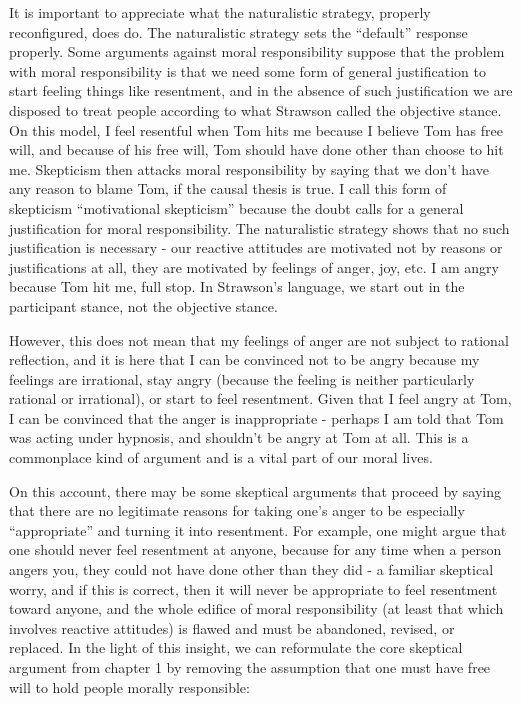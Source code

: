 \documentclass[phd,12pt,oneside,paper=letterpaper]{ubcthesis}
\begin{document}
It is important to appreciate what the naturalistic strategy, properly reconfigured, does do. The naturalistic strategy sets the ``default'' response properly. Some arguments against moral responsibility suppose that the problem with moral responsibility is that we need some form of general justification to start feeling things like resentment, and in the absence of such justification we are disposed to treat people according to what Strawson called the objective stance. On this model, I feel resentful when Tom hits me because I believe Tom has free will, and because of his free will, Tom should have done other than choose to hit me. Skepticism then attacks moral responsibility by saying that we don't have any reason to blame Tom, if the causal thesis is true. I call this form of skepticism ``motivational skepticism'' because the doubt calls for a general justification for moral responsibility. The naturalistic strategy shows that no such justification is necessary - our reactive attitudes are motivated not by reasons or justifications at all, they are motivated by feelings of anger, joy, etc. I am angry because Tom hit me, full stop. In Strawson's language, we start out in the participant stance, not the objective stance. 

However, this does not mean that my feelings of anger are not subject to rational reflection, and it is here that I can be convinced not to be angry because my feelings are irrational, stay angry (because the feeling is neither particularly rational or irrational), or start to feel resentment. Given that I feel angry at Tom, I can be convinced that the anger is inappropriate - perhaps I am told that Tom was acting under hypnosis, and shouldn't be angry at Tom at all. This is a commonplace kind of argument and is a vital part of our moral lives. 

On this account, there may be some skeptical arguments that proceed by saying that there are no legitimate reasons for taking one's anger to be especially ``appropriate'' and turning it into resentment. For example, one might argue that one should never feel resentment at anyone, because for any time when a person angers you, they could not have done other than they did - a familiar skeptical worry, and if this is correct, then it will never be appropriate to feel resentment toward anyone, and the whole edifice of moral responsibility (at least that which involves reactive attitudes) is flawed and must be abandoned, revised, or replaced. In the light of this insight, we can reformulate the core skeptical argument from chapter 1 by removing the assumption that one must have free will to hold people morally responsible:
\end{document}
